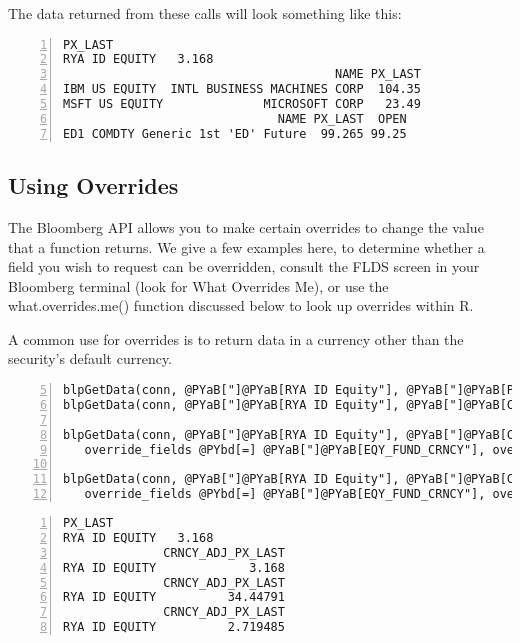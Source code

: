 \documentclass[a4paper]{article}
\begin{document}
    

The data returned from these calls will look something like this:

\begin{Verbatim}[commandchars=@\[\],numbers=left,firstnumber=1,stepnumber=1]
              PX_LAST
RYA ID EQUITY   3.168
                                      NAME PX_LAST
IBM US EQUITY  INTL BUSINESS MACHINES CORP  104.35
MSFT US EQUITY              MICROSOFT CORP   23.49
                              NAME PX_LAST  OPEN
ED1 COMDTY Generic 1st 'ED' Future  99.265 99.25
\end{Verbatim}

    


\subsection{Using Overrides} %
\label{sub:using_overrides}

The Bloomberg API allows you to make certain overrides to change the value that a function returns. We give a few examples here, to determine whether a field you wish to request can be overridden, consult the FLDS screen in your Bloomberg terminal (look for What Overrides Me), or use the what.overrides.me() function discussed below to look up overrides within R.

A common use for overrides is to return data in a currency other than the security's default currency.

\begin{Verbatim}[commandchars=@\[\],numbers=left,firstnumber=5,stepnumber=1]
blpGetData(conn, @PYaB["]@PYaB[RYA ID Equity"], @PYaB["]@PYaB[PX_LAST"])
blpGetData(conn, @PYaB["]@PYaB[RYA ID Equity"], @PYaB["]@PYaB[CRNCY_ADJ_PX_LAST"])

blpGetData(conn, @PYaB["]@PYaB[RYA ID Equity"], @PYaB["]@PYaB[CRNCY_ADJ_PX_LAST"], 
   override_fields @PYbd[=] @PYaB["]@PYaB[EQY_FUND_CRNCY"], overrides @PYbd[=] @PYaB["]@PYaB[HKD"])

blpGetData(conn, @PYaB["]@PYaB[RYA ID Equity"], @PYaB["]@PYaB[CRNCY_ADJ_PX_LAST"], 
   override_fields @PYbd[=] @PYaB["]@PYaB[EQY_FUND_CRNCY"], overrides @PYbd[=] @PYaB["]@PYaB[GBP"])
\end{Verbatim}

    

\begin{Verbatim}[commandchars=@\[\],numbers=left,firstnumber=1,stepnumber=1]
              PX_LAST
RYA ID EQUITY   3.168
              CRNCY_ADJ_PX_LAST
RYA ID EQUITY             3.168
              CRNCY_ADJ_PX_LAST
RYA ID EQUITY          34.44791
              CRNCY_ADJ_PX_LAST
RYA ID EQUITY          2.719485
\end{Verbatim}
\end{document}
